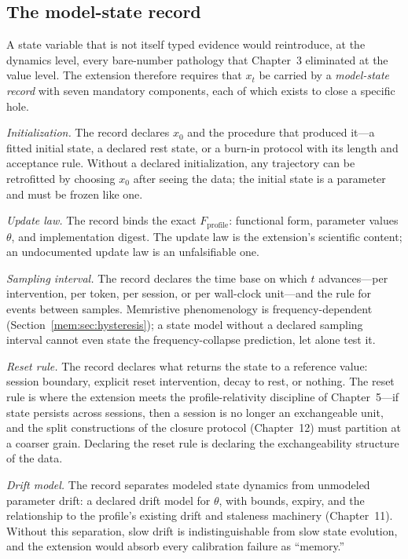 \subsection{The model-state record}\label{mem:sec:staterecord}

A state variable that is not itself typed evidence would reintroduce, at the dynamics level, every bare-number pathology that Chapter~3 eliminated at the value level. The extension therefore requires that $x_t$ be carried by a \emph{model-state record} with seven mandatory components, each of which exists to close a specific hole.

\emph{Initialization.} The record declares $x_0$ and the procedure that produced it---a fitted initial state, a declared rest state, or a burn-in protocol with its length and acceptance rule. Without a declared initialization, any trajectory can be retrofitted by choosing $x_0$ after seeing the data; the initial state is a parameter and must be frozen like one.

\emph{Update law.} The record binds the exact $F_{\mathrm{profile}}$: functional form, parameter values $\theta$, and implementation digest. The update law is the extension's scientific content; an undocumented update law is an unfalsifiable one.

\emph{Sampling interval.} The record declares the time base on which $t$ advances---per intervention, per token, per session, or per wall-clock unit---and the rule for events between samples. Memristive phenomenology is frequency-dependent (Section~\ref{mem:sec:hysteresis}); a state model without a declared sampling interval cannot even state the frequency-collapse prediction, let alone test it.

\emph{Reset rule.} The record declares what returns the state to a reference value: session boundary, explicit reset intervention, decay to rest, or nothing. The reset rule is where the extension meets the profile-relativity discipline of Chapter~5---if state persists across sessions, then a session is no longer an exchangeable unit, and the split constructions of the closure protocol (Chapter~12) must partition at a coarser grain. Declaring the reset rule is declaring the exchangeability structure of the data.

\emph{Drift model.} The record separates modeled state dynamics from unmodeled parameter drift: a declared drift model for $\theta$, with bounds, expiry, and the relationship to the profile's existing drift and staleness machinery (Chapter~11). Without this separation, slow drift is indistinguishable from slow state evolution, and the extension would absorb every calibration failure as ``memory.''

